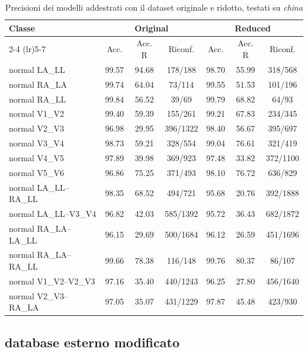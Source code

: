 \begin{table}[htbp]
	\centering
	\caption{Precisioni dei modelli addestrati con il dataset originale e ridotto, testati su \emph{china}}
	\label{tab:china_confronto}
	\scriptsize
	\begin{tabular}{l c c c c c c}
		\toprule
		Classe & \multicolumn{3}{c}{Original} & \multicolumn{3}{c}{Reduced} \\
		\cmidrule(lr){2-4} \cmidrule(lr){5-7}
		& Acc. & Acc. R & Riconf. & Acc. & Acc. R & Riconf. \\
		\midrule
		normal LA\_LL & 99.57 & 94.68 & 178/188  & 98.70 & 55.99 & 318/568  \\
		normal RA\_LA & 99.74 & 64.04 & 73/114   & 99.55 & 51.53 & 101/196  \\
		normal RA\_LL & 99.84 & 56.52 & 39/69    & 99.79 & 68.82 & 64/93    \\
		normal V1\_V2 & 99.40 & 59.39 & 155/261  & 99.21 & 67.83 & 234/345  \\
		normal V2\_V3 & 96.98 & 29.95 & 396/1322 & 98.40 & 56.67 & 395/697  \\
		normal V3\_V4 & 98.73 & 59.21 & 328/554  & 99.04 & 76.61 & 321/419  \\
		normal V4\_V5 & 97.89 & 39.98 & 369/923  & 97.48 & 33.82 & 372/1100 \\
		normal V5\_V6 & 96.86 & 75.25 & 371/493  & 98.10 & 76.72 & 636/829  \\
		normal LA\_LL--RA\_LL & 98.35 & 68.52 & 494/721  & 95.68 & 20.76 & 392/1888 \\
		normal LA\_LL--V3\_V4 & 96.82 & 42.03 & 585/1392 & 95.72 & 36.43 & 682/1872 \\
		normal RA\_LA--LA\_LL & 96.15 & 29.69 & 500/1684 & 96.12 & 26.59 & 451/1696 \\
		normal RA\_LA--RA\_LL & 99.66 & 78.38 & 116/148  & 99.76 & 80.37 & 86/107   \\
		normal V1\_V2--V2\_V3 & 97.16 & 35.40 & 440/1243 & 96.25 & 27.80 & 456/1640 \\
		normal V2\_V3--RA\_LA & 97.05 & 35.07 & 431/1229 & 97.87 & 45.48 & 423/930  \\
		\bottomrule
	\end{tabular}
\end{table}

\subsection{database esterno modificato}

